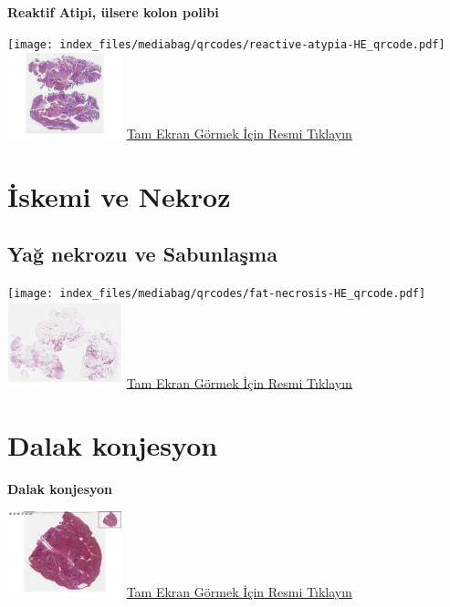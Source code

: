 \documentclass[
  letterpaper,
  DIV=11,
  numbers=noendperiod]{scrreprt}
\begin{document}
\textbf{Reaktif Atipi, ülsere kolon polibi}

\texttt{[image: index\_files/mediabag/qrcodes/reactive-atypia-HE\_qrcode.pdf]}
\href{https://images.patolojiatlasi.com/reactive-atypia/HE.html}{\includegraphics[width=0.25\textwidth,height=\textheight]{./screenshots/thumbnail_reactive-atypia.png}}
\href{https://images.patolojiatlasi.com/reactive-atypia/HE.html}{Tam
Ekran Görmek İçin Resmi Tıklayın}

\hypertarget{sec-iskemi-ve-nekroz}{%
\chapter{İskemi ve Nekroz}\label{sec-iskemi-ve-nekroz}}

\hypertarget{sec-yag-nekrozu-sabunlasma}{%
\section{Yağ nekrozu ve Sabunlaşma}\label{sec-yag-nekrozu-sabunlasma}}

\texttt{[image: index\_files/mediabag/qrcodes/fat-necrosis-HE\_qrcode.pdf]}
\href{https://images.patolojiatlasi.com/fat-necrosis/HE.html}{\includegraphics[width=0.25\textwidth,height=\textheight]{./screenshots/thumbnail_fat-necrosis.png}}
\href{https://images.patolojiatlasi.com/fat-necrosis/HE.html}{Tam Ekran
Görmek İçin Resmi Tıklayın}

\hypertarget{sec-congestion-spleen}{%
\chapter{Dalak konjesyon}\label{sec-congestion-spleen}}

\textbf{Dalak konjesyon}

\href{https://images.patolojiatlasi.com/congestion-spleen/HE.html}{\includegraphics[width=0.25\textwidth,height=\textheight]{./screenshots/thumbnail_congestion-spleen.png}}
\href{https://images.patolojiatlasi.com/congestion-spleen/HE.html}{Tam
Ekran Görmek İçin Resmi Tıklayın}
\end{document}
